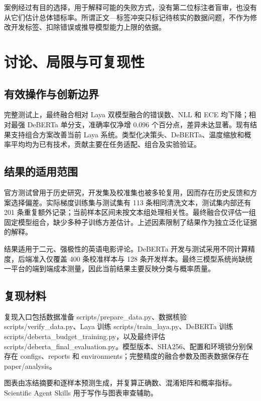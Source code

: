 \documentclass[UTF8,fontset=fandol,a4paper,11pt]{ctexart}
\begin{document}
案例经过有目的选择，用于解释可能的失败方式，没有第二位标注者盲审，也没有从它们估计总体错标率。所谓正文—标签冲突只标记待核实的数据问题，不作为修改开发标签、扣除错误或推导模型能力上限的依据。

\section{讨论、局限与可复现性}
\subsection{有效操作与创新边界}
完整测试上，最终融合相对 Laya 双模型融合的错误数、NLL 和 ECE 均下降；相对最强 DeBERTa 单分支，准确率仅净增 0.096 个百分点，差异未达显著。现有结果支持组合方案改善当前 Laya 系统。类型化决策头、DeBERTa、温度缩放和概率平均均为已有技术，贡献主要在任务适配、组合及实验验证。

\subsection{结果的适用范围}
官方测试曾用于历史研究，开发集及校准集也被多轮复用，因而存在历史反馈和方案选择偏差。实际梯度训练集与测试集有 113 条相同清洗文本，测试集内部还有 201 条重复额外记录；当前样本区间未按文本组处理相关性。最终融合仅评估一组固定模型组合，缺少多种子训练方差估计。上述因素限制了结果作为独立泛化证据的解释。

结果适用于二元、强极性的英语电影评论。DeBERTa 开发与测试采用不同计算精度，后端准入仅覆盖 400 条校准样本与 128 条开发样本。最终三模型系统尚缺统一平台的端到端成本测量，因此当前结果主要反映分类与概率质量。

\subsection{复现材料}
复现入口包括数据准备 scripts/prepare\_data.py、数据核验 scripts/verify\_data.py、Laya 训练 scripts/train\_laya.py、DeBERTa 训练 scripts/deberta\_budget\_training.py，以及最终评估 scripts/deberta\_final\_evaluation.py。模型版本、SHA256、配置和环境锁分别保存在 configs、reports 和 environments；完整精度的融合参数及图表数据保存在 paper/analysis。

图表由冻结摘要和逐样本预测生成，并复算正确数、混淆矩阵和概率指标。Scientific Agent Skills 用于写作与图表审查辅助\cite{skills}。
\end{document}
